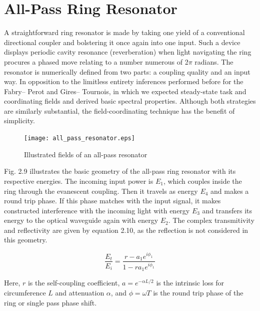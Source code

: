 \section{All-Pass Ring Resonator}
A straightforward ring resonator is made by taking one yield of a conventional directional coupler and bolstering it once again into one input. Such a device displays periodic cavity resonance (reverberation) when light navigating the ring procures a phased move relating to a number numerous of 2$\pi$ radians. The resonator is numerically defined from two parts: a coupling quality and an input way. In opposition to the limitless entirety inferences performed before for the Fabry– Perot and Gires– Tournois, in which we expected steady-state task and coordinating fields and derived basic spectral properties. Although both strategies are similarly substantial, the field-coordinating technique has the benefit of simplicity.
\begin{figure}[h]
\centering
\texttt{[image: all\_pass\_resonator.eps]}
\caption{Illustrated fields of an all-pass resonator}
\end{figure}

Fig. 2.9 illustrates the basic geometry of the all-pass ring resonator with its respective energies. The incoming input power is $E_{1}$, which couples inside the ring through the evanescent coupling. Then it travels as energy $E_{4}$ and makes a round trip phase. If this phase matches with the input signal, it makes constructed interference with the incoming light with energy $E_{3}$ and transfers its energy to the optical waveguide again with energy $E_{2}$. The complex transmitivity and reflectivity are given by equation 2.10, as the reflection is not considered in this geometry.
 

\begin{equation}
\frac{E_{t}}{E_{i}} = \frac{r - a_{1} e^{i\phi_{1}}}{1 - r a_{1} e^{i\phi_{1}}}
\end{equation}

Here, $r$ is the self-coupling coefficient, $a = e^{-\alpha L/2}$ is the intrinsic loss for circumference $L$ and attenuation $\alpha$, and $\phi = \omega T$ is the round trip phase of the ring or single pass phase shift.

